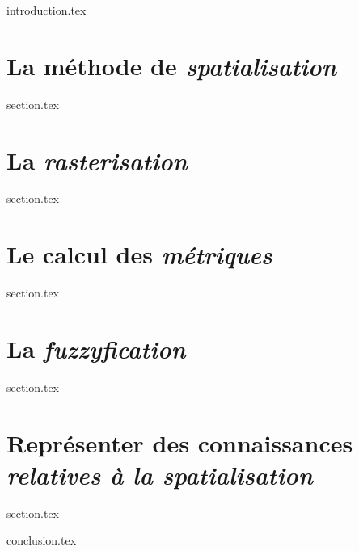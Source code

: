 \chaptertoc{}

\label{chap:07-int}
{introduction.tex}

\section{La méthode de \emph{spatialisation}}
\label{chap:07-sec1}
{section.tex}

\section{La \emph{rasterisation}}
\label{chap:07-sec2}
{section.tex}

\section{Le calcul des \emph{métriques}}
\label{chap:07-sec3}
{section.tex}

\section{La \emph{fuzzyfication}}
\label{chap:07-sec4}
{section.tex}

\section{Représenter des connaissances \emph{relatives à la spatialisation}}
\label{chap:07-sec5}
{section.tex}

\label{chap:07-cnc}
{conclusion.tex}

